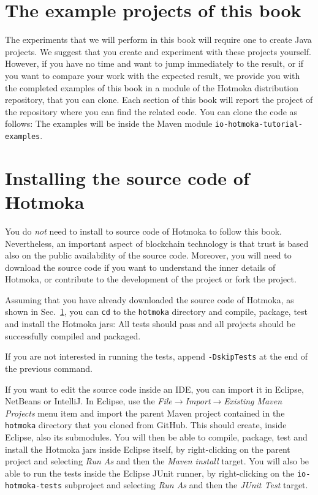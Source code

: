 \section{The example projects of this book}\label{sec:example_projects}

The experiments that we will perform in this book will
require one to create Java projects. We suggest that you create and
experiment with these projects yourself.
However, if you have no time and want to jump immediately to the result,
or if you want to compare your work
with the expected result, we provide you with the completed examples of this book in
a module of the Hotmoka distribution repository, that you can clone.
Each section of this book will report
the project of the repository where you can find the related code.
You can clone the code as follows:
%
%
The examples will be inside the Maven module
\texttt{io-hotmoka-tutorial-examples}.

\section{Installing the source code of Hotmoka}\label{sec:installing_source_code}

You do \emph{not} need to install to source code of Hotmoka to follow this
book. Nevertheless, an important aspect of blockchain technology is that
trust is based also on the public availability of the source code.
Moreover, you will need to download the source code if you want to understand
the inner details of Hotmoka, or contribute to the development of the project or
fork the project.

Assuming that you have already downloaded the source code of Hotmoka, as shown
in Sec.~\ref{sec:example_projects}, you can \texttt{cd} to the \texttt{hotmoka}
directory and compile, package, test and install the Hotmoka jars:
%
%
All tests should pass and all projects should be successfully compiled and packaged.

\begin{commentbox}
  If you are not interested in running the tests, append \texttt{-DskipTests} at the end
  of the previous command.
\end{commentbox}

If you want to edit the source code inside an IDE, you can import it in Eclipse,
NetBeans or IntelliJ.
In Eclipse, use the \emph{File$\rightarrow$Import$\rightarrow$Existing Maven Projects}
menu item and import
the parent Maven project contained in the \texttt{hotmoka} directory that you cloned from
GitHub. This should create, inside Eclipse, also its submodules.
You will then be able to compile, package, test and install the Hotmoka jars inside
Eclipse itself, by right-clicking on the parent project and selecting
\emph{Run As} and then the \emph{Maven install} target. You will also be able
to run the tests inside
the Eclipse JUnit runner, by right-clicking on the \texttt{io-hotmoka-tests} subproject
and selecting \emph{Run As} and then the \emph{JUnit Test} target.


